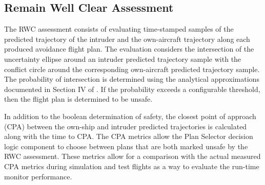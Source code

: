 \subsection{Remain Well Clear Assessment} 
The RWC assessment consists of evaluating time-stamped samples of the predicted trajectory of the intruder and the own-aircraft trajectory along each produced avoidance flight plan. The evaluation considers the intersection of the uncertainty ellipse around an intruder predicted trajectory sample with the conflict circle around the corresponding own-aircraft predicted trajectory sample. The probability of intersection is determined using the analytical approximations documented in Section IV of \cite{prob_conflict_detection}. If the probability exceeds a configurable threshold, then the flight plan is determined to be unsafe. 

In addition to the boolean determination of safety, the closest point of approach (CPA) between the own-ship and intruder predicted trajectories is calculated along with the time to CPA. The CPA metrics allow the Plan Selector decision logic component to choose between plans that are both marked unsafe by the RWC assessment. These metrics allow for a comparison with the actual measured CPA metrics during simulation and test flights as a way to evaluate the run-time monitor performance.

